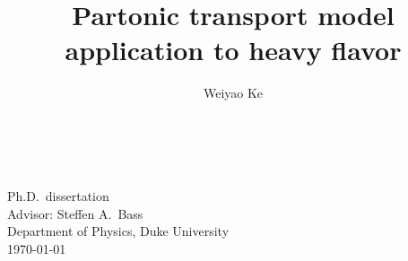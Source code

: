 \documentclass[11pt,letterpaper,oneside,openany]{book}
\title{Partonic transport model application to heavy flavor}
\author{Weiyao Ke}
\begin{document}
\frontmatter

\makeatletter
\begin{titlepage}
  \centering
  \sffamily
  \vspace*{.25\textheight}
  \Huge\@title \\
  \vspace{.05\textheight}
  \LARGE\@author \\
  \vspace{.05\textheight}
  \Large Ph.D.\ dissertation \\[.25ex]
  Advisor: Steffen A.\ Bass \\[.25ex]
  Department of Physics, Duke University \\
  \vspace{.05\textheight}
  \today
\end{titlepage}
\makeatother

%

\titlespacing{\chapter}{0pt}{-45pt}{30pt}
\setcounter{tocdepth}{1}
\titlespacing{\chapter}{0pt}{50pt}{40pt}

\mainmatter

\tableofcontents









\backmatter

{\raggedright\printbibliography[heading=bibintoc, title={dissertation}]}
\end{document}
